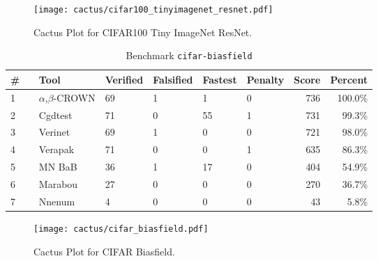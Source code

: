 \begin{figure}[h]
\centerline{\texttt{[image: cactus/cifar100\_tinyimagenet\_resnet.pdf]}}
\caption{Cactus Plot for CIFAR100 Tiny ImageNet ResNet.}
\label{fig:quantPic}
\end{figure}



\begin{table}[h]
\begin{center}
\caption{Benchmark \texttt{cifar-biasfield}} \label{tab:cat_{cat}}
{\setlength{\tabcolsep}{2pt}
\begin{tabular}[h]{@{}llllllrr@{}}
\toprule
\textbf{\# ~} & \textbf{Tool} & \textbf{Verified} & \textbf{Falsified} & \textbf{Fastest} & \textbf{Penalty} & \textbf{Score} & \textbf{Percent}\\
\midrule
1 & $\alpha$,$\beta$-CROWN & 69 & 1 & 1 & 0 & 736 & 100.0\% \\
2 & Cgdtest & 71 & 0 & 55 & 1 & 731 & 99.3\% \\
3 & Verinet & 69 & 1 & 0 & 0 & 721 & 98.0\% \\
4 & Verapak & 71 & 0 & 0 & 1 & 635 & 86.3\% \\
5 & MN BaB & 36 & 1 & 17 & 0 & 404 & 54.9\% \\
6 & Marabou & 27 & 0 & 0 & 0 & 270 & 36.7\% \\
7 & Nnenum & 4 & 0 & 0 & 0 & 43 & 5.8\% \\
\bottomrule
\end{tabular}
}
\end{center}
\end{table}



\begin{figure}[h]
\centerline{\texttt{[image: cactus/cifar\_biasfield.pdf]}}
\caption{Cactus Plot for CIFAR Biasfield.}
\label{fig:quantPic}
\end{figure}



